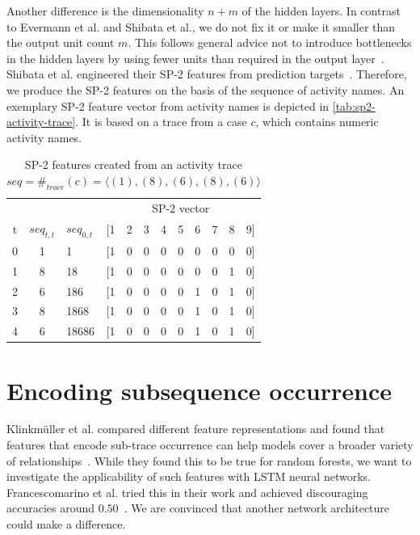 Another difference is the dimensionality $n+m$ of the hidden layers.
In contrast to Evermann et al. and Shibata et al., we do not fix it or make it smaller than the output unit count $m$.
This follows general advice not to introduce bottlenecks in the hidden layers by using fewer units than required in the output layer~\cite{web:techniques-in-convnets,szegedy2016rethinking}.\\

\noindent Shibata et al. engineered their SP-2 features from prediction targets~\cite{shibata2016bipartite}.
Therefore, we produce the SP-2 features on the basis of the sequence of activity names.
An exemplary SP-2 feature vector from activity names is depicted in \autoref{tab:sp2-activity-trace}.
It is based on a trace from a case $c$, which contains numeric activity names.


\begin{table}[!htb]
    \centering
    \begin{adjustbox}{center}
    \begin{tabular}{cclccccccccc}
          &      &              & \multicolumn{9}{c}{SP-2 vector}\\
 t & $seq_{t, t}$ & $seq_{0,t}$ & [1 & 2 & 3 & 4 & 5 & 6 & 7 & 8 & 9]\\
        \midrule
        0 & 1    & 1            & [1 & 0 & 0 & 0 & 0 & 0 & 0 & 0 & 0]\\
        1 & 8    & 18           & [1 & 0 & 0 & 0 & 0 & 0 & 0 & 1 & 0]\\
        2 & 6    & 186          & [1 & 0 & 0 & 0 & 0 & 1 & 0 & 1 & 0]\\
        3 & 8    & 1868         & [1 & 0 & 0 & 0 & 0 & 1 & 0 & 1 & 0]\\
        4 & 6    & 18686        & [1 & 0 & 0 & 0 & 0 & 1 & 0 & 1 & 0]\\
    \end{tabular}
    \end{adjustbox}
    \caption[SP-2 features created from an activity trace]{SP-2 features created from an activity trace $seq=\#_{trace}(c)=\langle (1), (8), (6), (8), (6)\rangle$}
    \label{tab:sp2-activity-trace}
\end{table}


\section{Encoding subsequence occurrence}\label{sec:contrib:pfs-inspiration}
Klinkmüller et al. compared different feature representations and found that features that encode sub-trace occurrence can help models cover a broader variety of relationships~\cite{klinkmuller2018reliablemonitoring}.
While they found this to be true for random forests, we want to investigate the applicability of such features with LSTM neural networks.
Francescomarino et al. tried this in their work and achieved discouraging accuracies around $0.50$~\cite{francescomarino2017}.
We are convinced that another network architecture could make a difference.

